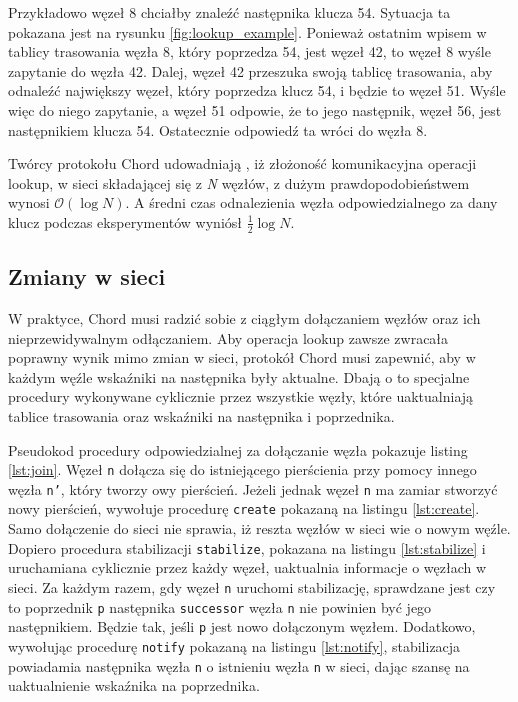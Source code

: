 \documentclass[12pt, twoside, openany]{report}
\begin{document}
Przykładowo węzeł 8 chciałby znaleźć następnika klucza 54. Sytuacja ta pokazana jest na rysunku \ref{fig:lookup_example}. Ponieważ ostatnim wpisem w tablicy trasowania węzła 8, który poprzedza 54, jest węzeł 42, to węzeł 8 wyśle zapytanie do węzła 42. Dalej, węzeł 42 przeszuka swoją tablicę trasowania, aby odnaleźć największy węzeł, który poprzedza klucz 54, i będzie to węzeł 51. Wyśle więc do niego zapytanie, a węzeł 51 odpowie, że to jego następnik, węzeł 56, jest następnikiem klucza 54. Ostatecznie odpowiedź ta wróci do węzła 8.

Twórcy protokołu Chord udowadniają \cite{bib:chord}, iż złożoność komunikacyjna operacji lookup, w sieci składającej się z \textit{N} węzłów, z dużym prawdopodobieństwem wynosi $\mathcal{O}(\log{}N)$. A średni czas odnalezienia węzła odpowiedzialnego za dany klucz podczas eksperymentów wyniósł $\frac{1}{2} \log{} N$.

\subsection{Zmiany w sieci}
\label{zmiany_w_sieci}

W praktyce, Chord musi radzić sobie z ciągłym dołączaniem węzłów oraz ich nieprzewidywalnym odłączaniem. Aby operacja lookup zawsze zwracała poprawny wynik mimo zmian w sieci, protokół Chord musi zapewnić, aby w każdym węźle wskaźniki na następnika były aktualne. Dbają o to specjalne procedury wykonywane cyklicznie przez wszystkie węzły, które uaktualniają tablice trasowania oraz wskaźniki na następnika i poprzednika. 

Pseudokod procedury odpowiedzialnej za dołączanie węzła pokazuje listing \ref{lst:join}. Węzeł \texttt{n} dołącza się do istniejącego pierścienia przy pomocy innego węzła \texttt{n'}, który tworzy owy pierścień. Jeżeli jednak węzeł \texttt{n} ma zamiar stworzyć nowy pierścień, wywołuje procedurę \texttt{create} pokazaną na listingu \ref{lst:create}. Samo dołączenie do sieci nie sprawia, iż reszta węzłów w sieci wie o nowym węźle. Dopiero procedura stabilizacji \texttt{stabilize}, pokazana na listingu \ref{lst:stabilize} i uruchamiana cyklicznie przez każdy węzeł, uaktualnia informacje o węzłach w sieci. Za każdym razem, gdy węzeł \texttt{n} uruchomi stabilizację, sprawdzane jest czy to poprzednik \texttt{p} następnika \texttt{successor} węzła \texttt{n} nie powinien być jego następnikiem. Będzie tak, jeśli \texttt{p} jest nowo dołączonym węzłem. Dodatkowo, wywołując procedurę \texttt{notify} pokazaną na listingu \ref{lst:notify}, stabilizacja powiadamia następnika węzła \texttt{n} o istnieniu węzła \texttt{n} w sieci, dając szansę na uaktualnienie wskaźnika na poprzednika.
\end{document}
